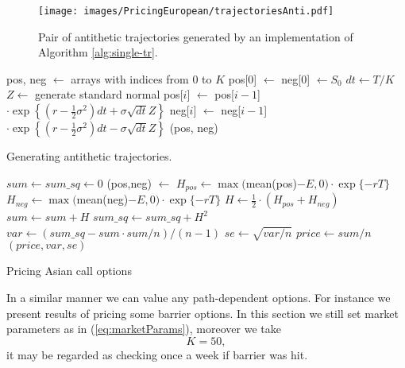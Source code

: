 \documentclass[a4paper,11pt, twoside]{book}
\theoremstyle{definition}
\theoremstyle{remark}
\begin{document}
\begin{figure}
\centering
 \texttt{[image: images/PricingEuropean/trajectoriesAnti.pdf]}
\caption{Pair of antithetic trajectories generated by an implementation of Algorithm \ref{alg:single-tr}.}
\label{fig:trajectoriesAnti}
\end{figure}
\begin{algorithm}
 \begin{algorithmic}[1]
  \State pos, neg $\gets$ arrays with indices from $0$ to $K$
  \State pos[0] $\gets$ neg[0] $\gets S_0$
  \State $dt \gets T/K$
    \State $Z \gets$ generate standard normal
    \State pos[$i$] $\gets$ pos[$i-1$] $\cdot \exp\left\{ (r - \frac{1}{2}\sigma^2) dt + \sigma \sqrt{dt} Z \right\}$
    \State neg[$i$] $\gets$ neg[$i-1$] $\cdot \exp\left\{ (r - \frac{1}{2}\sigma^2) dt - \sigma \sqrt{dt} Z \right\}$
  \EndFor
  \State \Return (pos, neg)
  \EndFunction
 \end{algorithmic}
 \caption{Generating antithetic trajectories.}
 \label{alg:single-tr}
\end{algorithm}
 
\begin{algorithm}
 \begin{algorithmic}[1]
    \State  $sum \gets sum\_sq \gets 0$
      \State (pos,neg) $\gets$ 
      \State $H_{pos} \gets \max($mean(pos)$- E, 0) \cdot \exp\{-rT\}$
      \State $H_{neg} \gets \max($mean(neg)$- E, 0) \cdot \exp\{-rT\}$
      \State $H \gets \frac{1}{2} \cdot (H_{pos} + H_{neg})$
      \State $sum \gets sum + H$
      \State $ sum\_sq \gets sum\_sq + H^2$
    \EndFor
    \State $var \gets (sum\_sq - sum \cdot sum/n) / (n-1)$
    \State $se \gets \sqrt{var / n}$
    \State $price \gets sum / n$
    \State \Return $(price, var, se)$
  \EndFunction
 \end{algorithmic}
 \caption{Pricing Asian call options}
 \label{alg:priceAsianAV}
\end{algorithm}

In a similar manner we can value any path-dependent options. For instance we present results of pricing some barrier options. In this section we still set market parameters as in (\ref{eq:marketParams}), moreover we take
\[ K = 50, \]
it may be regarded as checking once a week if barrier was hit.
\end{document}

